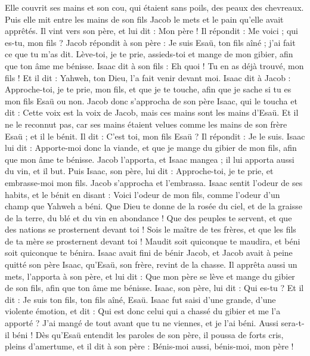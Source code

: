\begin{multicols}{2}
Elle couvrit ses mains et son cou, qui étaient sans poils, des peaux des chevreaux.
Puis elle mit entre les mains de son fils Jacob le mets et le pain qu'elle avait apprêtés.
Il vint vers son père, et lui dit : Mon père ! Il répondit : Me voici ; qui es-tu, mon fils ?
Jacob répondit à son père : Je suis Esaü, ton fils aîné ; j'ai fait ce que tu m'as dit. Lève-toi, je te prie, assieds-toi et mange de mon gibier, afin que ton âme me bénisse.
Isaac dit à son fils : Eh quoi ! Tu en as déjà trouvé, mon fils ! Et il dit : Yahweh, ton Dieu, l'a fait venir devant moi.
Isaac dit à Jacob : Approche-toi, je te prie, mon fils, et que je te touche, afin que je sache si tu es mon fils Esaü ou non.
Jacob donc s'approcha de son père Isaac, qui le toucha et dit : Cette voix est la voix de Jacob, mais ces mains sont les mains d'Esaü.
Et il ne le reconnut pas, car ses mains étaient velues comme les mains de son frère Esaü ; et il le bénit.
Il dit : C'est toi, mon fils Esaü ? Il répondit : Je le suis.
Isaac lui dit : Apporte-moi donc la viande, et que je mange du gibier de mon fils, afin que mon âme te bénisse. Jacob l'apporta, et Isaac mangea ; il lui apporta aussi du vin, et il but.
Puis Isaac, son père, lui dit : Approche-toi, je te prie, et embrasse-moi mon fils.
Jacob s'approcha et l'embrassa. Isaac sentit l'odeur de ses habits, et le bénit en disant : Voici l'odeur de mon fils, comme l'odeur d'un champ que Yahweh a béni.
Que Dieu te donne de la rosée du ciel, et de la graisse de la terre, du blé et du vin en abondance !
Que des peuples te servent, et que des nations se prosternent devant toi ! Sois le maître de tes frères, et que les fils de ta mère se prosternent devant toi ! Maudit soit quiconque te maudira, et béni soit quiconque te bénira.
Isaac avait fini de bénir Jacob, et Jacob avait à peine quitté son père Isaac, qu'Esaü, son frère, revint de la chasse.
Il apprêta aussi un mets, l'apporta à son père, et lui dit : Que mon père se lève et mange du gibier de son fils, afin que ton âme me bénisse.
Isaac, son père, lui dit : Qui es-tu ? Et il dit : Je suis ton fils, ton fils aîné, Esaü.
Isaac fut saisi d'une grande, d'une violente émotion, et dit : Qui est donc celui qui a chassé du gibier et me l'a apporté ? J'ai mangé de tout avant que tu ne viennes, et je l'ai béni. Aussi sera-t-il béni !
Dès qu'Esaü entendit les paroles de son père, il poussa de forts cris, pleins d'amertume, et il dit à son père : Bénis-moi aussi, bénis-moi, mon père !

\end{multicols}
